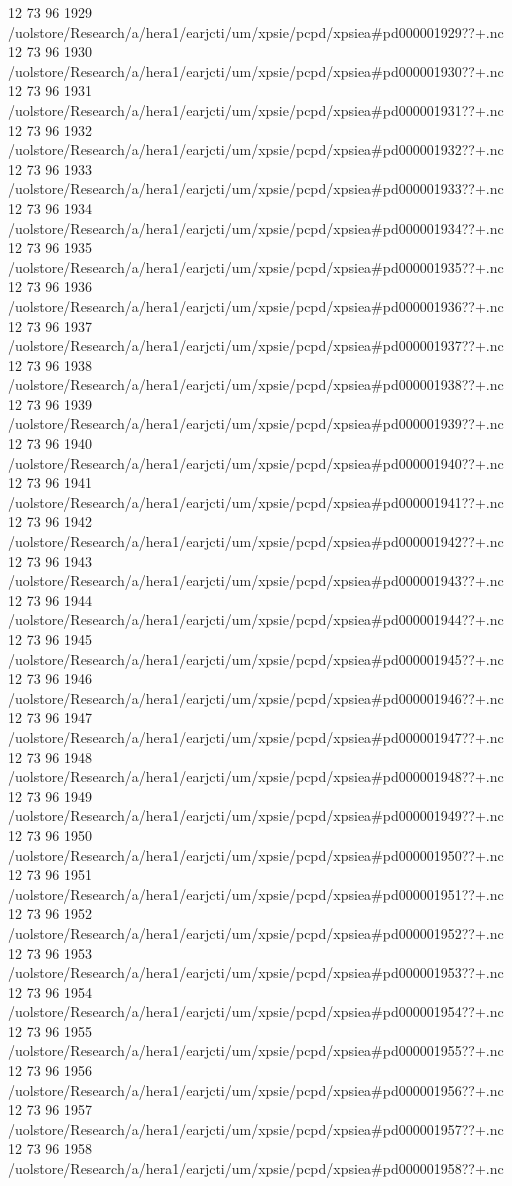 12 73 96
1929
/uolstore/Research/a/hera1/earjcti/um/xpsie/pcpd/xpsiea#pd000001929??+.nc
12 73 96
1930
/uolstore/Research/a/hera1/earjcti/um/xpsie/pcpd/xpsiea#pd000001930??+.nc
12 73 96
1931
/uolstore/Research/a/hera1/earjcti/um/xpsie/pcpd/xpsiea#pd000001931??+.nc
12 73 96
1932
/uolstore/Research/a/hera1/earjcti/um/xpsie/pcpd/xpsiea#pd000001932??+.nc
12 73 96
1933
/uolstore/Research/a/hera1/earjcti/um/xpsie/pcpd/xpsiea#pd000001933??+.nc
12 73 96
1934
/uolstore/Research/a/hera1/earjcti/um/xpsie/pcpd/xpsiea#pd000001934??+.nc
12 73 96
1935
/uolstore/Research/a/hera1/earjcti/um/xpsie/pcpd/xpsiea#pd000001935??+.nc
12 73 96
1936
/uolstore/Research/a/hera1/earjcti/um/xpsie/pcpd/xpsiea#pd000001936??+.nc
12 73 96
1937
/uolstore/Research/a/hera1/earjcti/um/xpsie/pcpd/xpsiea#pd000001937??+.nc
12 73 96
1938
/uolstore/Research/a/hera1/earjcti/um/xpsie/pcpd/xpsiea#pd000001938??+.nc
12 73 96
1939
/uolstore/Research/a/hera1/earjcti/um/xpsie/pcpd/xpsiea#pd000001939??+.nc
12 73 96
1940
/uolstore/Research/a/hera1/earjcti/um/xpsie/pcpd/xpsiea#pd000001940??+.nc
12 73 96
1941
/uolstore/Research/a/hera1/earjcti/um/xpsie/pcpd/xpsiea#pd000001941??+.nc
12 73 96
1942
/uolstore/Research/a/hera1/earjcti/um/xpsie/pcpd/xpsiea#pd000001942??+.nc
12 73 96
1943
/uolstore/Research/a/hera1/earjcti/um/xpsie/pcpd/xpsiea#pd000001943??+.nc
12 73 96
1944
/uolstore/Research/a/hera1/earjcti/um/xpsie/pcpd/xpsiea#pd000001944??+.nc
12 73 96
1945
/uolstore/Research/a/hera1/earjcti/um/xpsie/pcpd/xpsiea#pd000001945??+.nc
12 73 96
1946
/uolstore/Research/a/hera1/earjcti/um/xpsie/pcpd/xpsiea#pd000001946??+.nc
12 73 96
1947
/uolstore/Research/a/hera1/earjcti/um/xpsie/pcpd/xpsiea#pd000001947??+.nc
12 73 96
1948
/uolstore/Research/a/hera1/earjcti/um/xpsie/pcpd/xpsiea#pd000001948??+.nc
12 73 96
1949
/uolstore/Research/a/hera1/earjcti/um/xpsie/pcpd/xpsiea#pd000001949??+.nc
12 73 96
1950
/uolstore/Research/a/hera1/earjcti/um/xpsie/pcpd/xpsiea#pd000001950??+.nc
12 73 96
1951
/uolstore/Research/a/hera1/earjcti/um/xpsie/pcpd/xpsiea#pd000001951??+.nc
12 73 96
1952
/uolstore/Research/a/hera1/earjcti/um/xpsie/pcpd/xpsiea#pd000001952??+.nc
12 73 96
1953
/uolstore/Research/a/hera1/earjcti/um/xpsie/pcpd/xpsiea#pd000001953??+.nc
12 73 96
1954
/uolstore/Research/a/hera1/earjcti/um/xpsie/pcpd/xpsiea#pd000001954??+.nc
12 73 96
1955
/uolstore/Research/a/hera1/earjcti/um/xpsie/pcpd/xpsiea#pd000001955??+.nc
12 73 96
1956
/uolstore/Research/a/hera1/earjcti/um/xpsie/pcpd/xpsiea#pd000001956??+.nc
12 73 96
1957
/uolstore/Research/a/hera1/earjcti/um/xpsie/pcpd/xpsiea#pd000001957??+.nc
12 73 96
1958
/uolstore/Research/a/hera1/earjcti/um/xpsie/pcpd/xpsiea#pd000001958??+.nc
